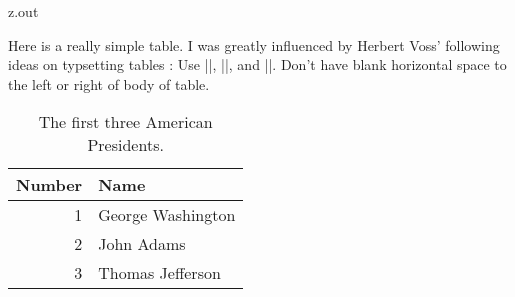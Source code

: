 

\begin{VerbatimOut}{z.out}

Here is a really simple table.
I was greatly influenced
by Herbert Voss' following ideas
on typsetting tables
\cite{voss2011}:
Use |\toprule|, |\midrule|, and |\bottomrule|.
\index{\verb+\toprule+}
\index{\verb+\midrule+}
\index{\verb+\bottomrule+}
Don't have blank horizontal space to the left
or right of body of table.

\begin{table}[ht]
  \caption{The first three American Presidents.}
  \vspace*{6pt}
  \centering
    \begin{tabular}{@{}rl@{}}
      \toprule
      \bf Number& \bf Name\\
      \midrule
      1& George Washington\\
      2& John Adams\\
      3& Thomas Jefferson\\
      \bottomrule
    \end{tabular}
  \label{ta:first-three-american-presidents}
\end{table}
\index{\verb+\begin{table}+}
\end{VerbatimOut}

